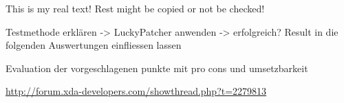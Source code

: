 This is my real text! Rest might be copied or not be checked!

Testmethode erklären -> LuckyPatcher anwenden -> erfolgreich?\newline
Result in die folgenden Auswertungen einfliessen lassen\newline


Evaluation der vorgeschlagenen punkte mit pro cons und umsetzbarkeit\newline

\url{http://forum.xda-developers.com/showthread.php?t=2279813}\newline
